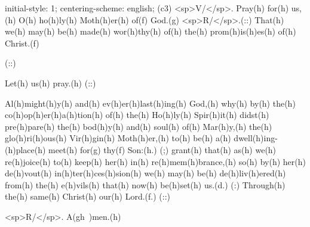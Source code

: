 initial-style: 1;
centering-scheme: english;
(c3) <sp>V/</sp>. Pray(h) for(h) us,(h) O(h) ho(h)ly(h) Moth(h)er(h) of(f) God.(g) <sp>R/</sp>.(::) That(h) we(h) may(h) be(h) made(h) wor(h)thy(h) of(h) the(h) prom(h)is(h)es(h) of(h) Christ.(f)

(::)

Let(h) us(h) pray.(h) (::)

Al(h)might(h)y(h) and(h) ev(h)er(h)last(h)ing(h) God,(h) why(h) by(h) the(h) co(h)op(h)er(h)a(h)tion(h) of(h) the(h) Ho(h)ly(h) Spir(h)it(h) didst(h) pre(h)pare(h) the(h) bod(h)y(h) and(h) soul(h) of(h) Mar(h)y,(h) the(h) glo(h)ri(h)ous(h) Vir(h)gin(h) Moth(h)er,(h) to(h) be(h) a(h) dwell(h)ing-(h)place(h) meet(h) for(g) thy(f) Son:(h.) (;) grant(h) that(h) as(h) we(h) re(h)joice(h) to(h) keep(h) her(h) in(h) re(h)mem(h)brance,(h) so(h) by(h) her(h) de(h)vout(h) in(h)ter(h)ces(h)sion(h) we(h) may(h) be(h) de(h)liv(h)ered(h) from(h) the(h) e(h)vils(h) that(h) now(h) be(h)set(h) us.(d.) (:) Through(h) the(h) same(h) Christ(h) our(h) Lord.(f.) (::)

<sp>R/</sp>. A(gh~)men.(h)